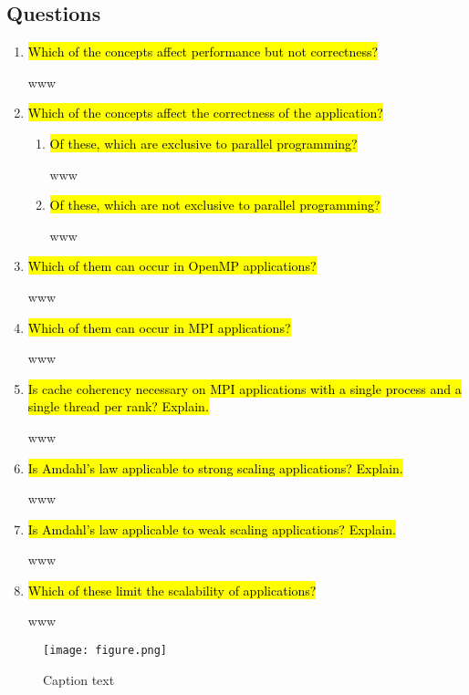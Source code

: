 \documentclass{article}
\begin{document}
\subsection{Questions}
\begin{enumerate}
	\item \hl{Which of the concepts affect performance but not correctness?}

	www

	\item \hl{Which of the concepts affect the correctness of the application?} ~

	\begin{enumerate}[label=\Alph*]
		\item \hl{Of these, which are exclusive to parallel programming?}

		www

		\item \hl{Of these, which are not exclusive to parallel programming?}

		www
	\end{enumerate}

	\item \hl{Which of them can occur in OpenMP applications?}

	www
	
	\item \hl{Which of them can occur in MPI applications?}

	www
	
	\item \hl{Is cache coherency necessary on MPI applications with a single process and a single thread per rank? Explain.}

	www
	
	\item \hl{Is Amdahl's law applicable to strong scaling applications? Explain.}

	www
	
	\item \hl{Is Amdahl's law applicable to weak scaling applications? Explain.}

	www
	
	\item \hl{Which of these limit the scalability of applications?}

	www
	
\end{enumerate}

\begin{figure}[h!] %
 	\begin{center}
 		\texttt{[image: figure.png]} %
 		\caption{Caption text}
 		\label{fig:figureLabelName}
 	\end{center}
\end{figure}
\end{document}

